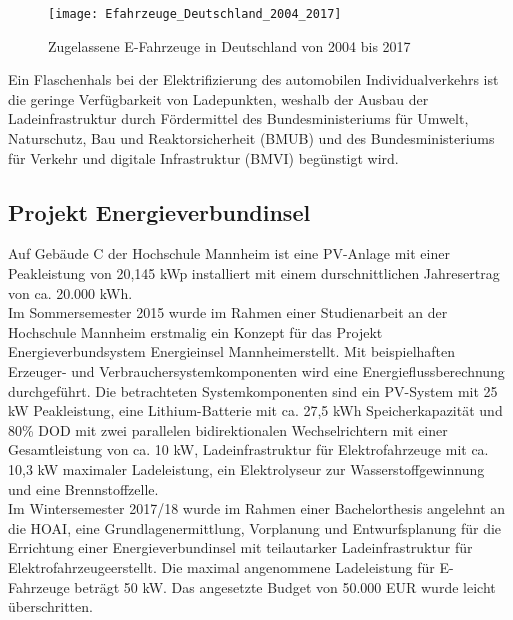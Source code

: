 	\begin{figure}[h]
		\centering
		\texttt{[image: Efahrzeuge\_Deutschland\_2004\_2017]}
		\caption{Zugelassene E-Fahrzeuge in Deutschland von 2004 bis 2017 \cite{KBA_EAutos_Zulassungen} }
		\label{Abb:Efahrzeuge_Deutschland_2004_2017}
	\end{figure}
	
	Ein Flaschenhals bei der Elektrifizierung des automobilen Individualverkehrs ist die geringe Verfügbarkeit von Ladepunkten, weshalb der Ausbau der Ladeinfrastruktur durch Fördermittel des Bundesministeriums für Umwelt, Naturschutz, Bau und Reaktorsicherheit (BMUB) und des Bundesministeriums für Verkehr und digitale Infrastruktur (BMVI) begünstigt wird.\cite{BMVI_Frderrichtlinie_Ladeinfra}\\

	\subsection{Projekt Energieverbundinsel}
		Auf Gebäude C der Hochschule Mannheim ist eine PV-Anlage mit einer Peakleistung von 20,145 kWp installiert mit einem durschnittlichen Jahresertrag von ca. 20.000 kWh. \\  %
		
		Im Sommersemester 2015 wurde im Rahmen einer Studienarbeit an der Hochschule Mannheim erstmalig ein Konzept für das Projekt Energieverbundsystem \glqq Energieinsel Mannheim\grqq \space erstellt. Mit beispielhaften Erzeuger- und Verbrauchersystemkomponenten wird eine Energieflussberechnung durchgeführt. Die betrachteten Systemkomponenten sind ein PV-System mit 25 kW Peakleistung, eine Lithium-Batterie mit ca. 27,5 kWh Speicherkapazität und 80\% \ac{DOD} mit zwei parallelen bidirektionalen Wechselrichtern mit einer Gesamtleistung von ca. 10 kW, Ladeinfrastruktur für Elektrofahrzeuge mit ca. 10,3 kW maximaler Ladeleistung, ein Elektrolyseur zur Wasserstoffgewinnung und eine Brennstoffzelle.\cite{STA_Oliver_Kersten_2015}\\

		Im Wintersemester 2017/18 wurde im Rahmen einer Bachelorthesis angelehnt an die \ac{HOAI}, eine Grundlagenermittlung, Vorplanung und Entwurfsplanung für die \glqq Errichtung einer Energieverbundinsel mit teilautarker Ladeinfrastruktur für Elektrofahrzeuge\grqq \space  erstellt. Die maximal angenommene Ladeleistung für E-Fahrzeuge beträgt 50 kW. Das angesetzte Budget von 50.000 EUR wurde leicht überschritten.\cite{BA_Chris_Ong_2017}\\
		
